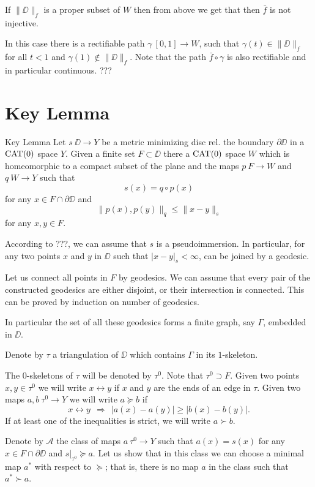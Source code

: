 \documentclass[a4paper,10pt]{amsart}
\begin{document}
If $\|\DD\|_f$ is a proper subset of $W$ 
then from above we get that
then $\bar f$ is not injective.

In this case there is a rectifiable path $\gamma\:[0,1]\to W$,
such that $\gamma(t)\in\|\DD\|_f$ for all $t<1$ and $\gamma(1)\notin \|\DD\|_f$.
Note that the path $\bar f\circ \gamma$ is also rectifiable and in particular continuous.
???
\qeds








\section{Key Lemma}


\begin{thm}{Key Lemma}\label{lem:key}
Let $s\:\DD\to Y$ 
be a metric minimizing disc rel. the boundary $\partial \DD$
in a $\mathop{\rm CAT}\nolimits(0)$ space $Y$.
Given a finite set $F\subset \DD$
there a $\mathop{\rm CAT}\nolimits(0)$ space $W$ which is homeomorphic to a compact subset of the plane
and the maps $p\:F\to W$ and $q\:W\to Y$ such that
\[s(x)=q\circ p(x)\] 
for any $x\in F\cap \partial \DD$
and 
\[\|p(x),p(y)\|_q\le \|x-y\|_s\] 
for any $x,y\in F$.
\end{thm}

According to ???, we can assume that $s$ is a pseudoimmersion.
In particular, 
for any two points $x$ and $y$ in $\DD$ such that $|x-y|_s<\infty$,
can be joined by a geodesic.

Let us connect all points in $F$ by geodesics.
We can assume that 
every pair of the constructed geodesics 
are either disjoint, or their intersection is connected.
This can be proved by induction on number of geodesics.


In particular the set of all these geodesics forms a finite graph, say $\Gamma$,
embedded in $\DD$. 

Denote by $\tau$ a triangulation of $\DD$ which contains $\Gamma$ in its $1$-skeleton.

The $0$-skeletons of $\tau$ will be denoted by $\tau^0$.
Note that $\tau^0\supset F$. 
Given two points $x,y\in \tau^0$ we will write 
$x \leftrightarrow y$ if $x$ and $y$ are the ends of an edge in $\tau$. 
Given two maps $a,b\:\tau^0\to Y$ we will write
$a\succcurlyeq b$ if 
\[x\leftrightarrow y\ \ \Rightarrow\ \ |a(x)-a(y)|\ge |b(x)-b(y)|.\]
If at least one of the inequalities is strict, we will write $a\succ b$.

Denote by $\mathcal{A}$ the class of maps $a\:\tau^0\to Y$ such that
$a(x)=s(x)$ for any $x\in F\cap\partial \DD$ and $s|_{\tau^0}\succcurlyeq a$.
Let us show that in this class we can choose a minimal map $a^*$ with respect to $\succcurlyeq$;
that is, there is no map $a$ in the class such that  $a^*\succ a$.
\end{document}
